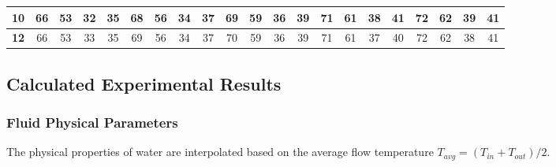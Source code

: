 \begin{table}[H]
{\begin{tabular}{|c|c|c|c|c|c|c|c|c|c|c|c|c|c|c|c|c|c|c|c|c|}
            \textbf{10}        & 66                                   & 53                                   & 32                                   & 35                                    & 68                                    & 56          & 34         & 37          & 69         & 59          & 36         & 39          & 71         & 61          & 38         & 41          & 72         & 62          & 39         & 41          \\ \hline
            \textbf{12}        & 66                                   & 53                                   & 33                                   & 35                                    & 69                                    & 56          & 34         & 37          & 70         & 59          & 36         & 39          & 71         & 61          & 37         & 40          & 72         & 62          & 38         & 41          \\ \hline
        \end{tabular}
    }
\end{table}

\subsection{Calculated Experimental Results}\label{exp-results}

\subsubsection{Fluid Physical Parameters}\label{fluid-params}

The physical properties of water are interpolated based on the average flow temperature $T_{avg} = (T_{in} + T_{out})/2$.

